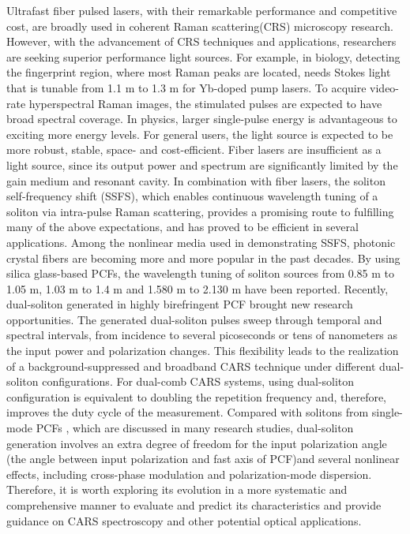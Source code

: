 \documentclass{osa-article}
\begin{document}
Ultrafast fiber pulsed lasers, with their remarkable performance and competitive cost, are broadly used in coherent Raman scattering(CRS) microscopy research\cite{andresen_tunable_2006, andresen_stimulated_2011, Gottschall.2015, Krafft.2016}. However, with the advancement of CRS techniques and applications, researchers are seeking superior performance light sources. For example, in biology, detecting the fingerprint region, where most Raman peaks are located, needs Stokes light that is tunable from 1.1 \textmu m to 1.3 \textmu m for Yb-doped pump lasers\cite{Gottschall.2015}. To acquire video-rate hyperspectral Raman images, the stimulated pulses are expected to have broad spectral coverage. In physics, larger single-pulse energy is advantageous to exciting more energy levels. For general users, the light source is expected to be more robust, stable, space- and cost-efficient. Fiber lasers are insufficient as a light source, since its output power and spectrum are significantly limited by the gain medium and resonant cavity. In combination with fiber lasers, the soliton self-frequency shift (SSFS), which enables continuous wavelength tuning of a soliton via intra-pulse Raman scattering, provides a promising route to fulfilling many of the above expectations, and has proved to be efficient in several applications\cite{Paulsen2003,yuan_red-shifted_2015,Li.2017}. Among the nonlinear media used in demonstrating SSFS, photonic crystal fibers are becoming more and more popular in the past decades. By using silica glass-based PCFs, the wavelength tuning of soliton sources from 0.85 \textmu m to 1.05 \textmu m\cite{Su2013}, 1.03 \textmu m to 1.4 \textmu m\cite{Andresen.2007} and 1.580 \textmu m to 2.130 \textmu m\cite{wang.2011} have been reported. Recently, dual-soliton generated in highly birefringent PCF brought new research opportunities. The generated dual-soliton pulses sweep through temporal and spectral intervals, from incidence to several picoseconds or tens of nanometers as the input power and polarization changes. This flexibility leads to the realization of a background-suppressed\cite{chen_dual-soliton_2016} and broadband\cite{chen_cascaded_2016} CARS technique under different dual-soliton configurations. For dual-comb CARS systems\cite{ideguchi_coherent_2013, mohler_dual-comb_2017}, using dual-soliton configuration is equivalent to doubling the repetition frequency and, therefore, improves the duty cycle of the measurement. Compared with solitons from single-mode PCFs \cite{klarskov_supercontinuum_2011,arteaga-sierra_supercontinuum_2014,Qiu.2014}, which are discussed in many research studies, dual-soliton generation involves an extra degree of freedom for the input polarization angle (the angle between input polarization and fast axis of PCF)and several nonlinear effects, including cross-phase modulation and polarization-mode dispersion. Therefore, it is worth exploring its evolution in a more systematic and comprehensive manner to evaluate and predict its characteristics and provide guidance on CARS spectroscopy and other potential optical applications. 
\end{document}
